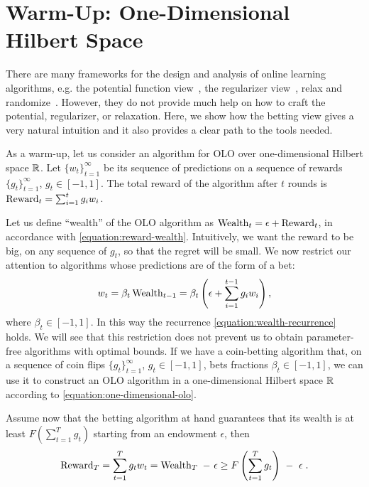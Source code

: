 \section{Warm-Up: One-Dimensional Hilbert Space}
\label{section:one-dimensional-hilbert-space-olo}

There are many frameworks for the design and analysis of online learning
algorithms, e.g. the potential function view~\cite{Cesa-Bianchi-Lugosi-2006},
the regularizer view~\cite{Shalev-Shwartz-2011}, relax and
randomize~\cite{Rakhlin-Shamir-Sridharan-2012}. However, they do not
provide much help on how to craft the potential, regularizer, or relaxation.
Here, we show how the betting view gives a very natural intuition and it also provides a clear path to the tools needed.

As a warm-up, let us consider an algorithm for OLO over one-dimensional Hilbert
space $\mathbb{R}$.  Let $\{w_t\}_{t=1}^\infty$ be its sequence of predictions on a
sequence of rewards $\{g_t\}_{t=1}^\infty$, $g_t \in [-1,1]$. The total reward
of the algorithm after $t$ rounds is $\operatorname{Reward}_t = \sum_{i=1}^t g_i w_i$.

Let us define ``wealth'' of the OLO algorithm as $\operatorname{Wealth}_t = \epsilon +
\operatorname{Reward}_t$, in accordance with \eqref{equation:reward-wealth}.
Intuitively, we want the reward to be big, on any sequence of $g_t$, so that
the regret will be small. We now restrict our attention to algorithms whose
predictions are of the form of a bet:
\vspace{-.1cm}
\begin{equation}
\label{equation:one-dimensional-olo}
w_t = \beta_t \operatorname{Wealth}_{t-1}
= \beta_t \left(\epsilon+ \sum_{i=1}^{t-1} g_i w_i \right),
\end{equation}
where $\beta_t \in [-1,1]$. In this way the recurrence
\eqref{equation:wealth-recurrence} holds. We will see that this restriction
does not prevent us to obtain parameter-free algorithms with optimal bounds.
If we have a coin-betting algorithm that, on a sequence of coin flips
$\{g_t\}_{t=1}^\infty$, $g_t \in [-1,1]$, bets fractions $\beta_t \in [-1,1]$,
we can use it to construct an OLO algorithm in a one-dimensional Hilbert space
$\mathbb{R}$ according to \eqref{equation:one-dimensional-olo}.

Assume now that the betting algorithm at hand guarantees that its wealth is at
least $F(\sum_{t=1}^T g_t)$ starting from an endowment $\epsilon$, then
\vspace{-.1cm}
\begin{equation}
\label{equation:one-dimensional-olo-reward-lower-bound}
\Reward_T
= \sum_{t=1}^T g_t w_t
= \Wealth_T \ - \ \epsilon \ge F\left(\sum_{t=1}^T g_t \right) \ - \ \epsilon \; .
\end{equation}

